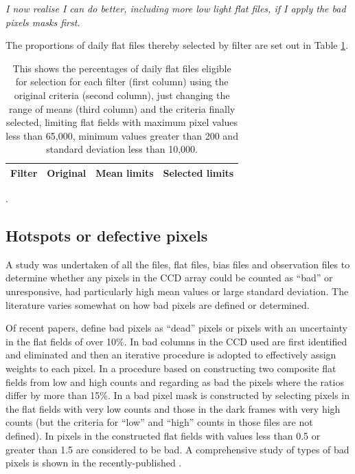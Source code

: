 \textit{I now realise I can do better, including more low light flat files, if
I apply the bad pixels masks first.}

The proportions of daily flat files thereby selected by filter are set out in
Table \ref{table:selectedflats}.

\begin{table}[!htbp]
\begin{center}
\begin{tabular}{lrrr} \hline
Filter & Original & Mean limits & Selected limits\\\hline

\hline
\end{tabular}
\end{center}
\caption{This shows the percentages of daily flat files eligible for selection
for each filter (first column) using the original criteria (second column),
just changing the range of means (third column) and the criteria finally
selected, limiting flat fields with maximum pixel values less than 65,000,
minimum values greater than 200 and standard deviation less than 10,000.}.
\protect\label{table:selectedflats}
\end{table}
\clearpage

\subsection{Hotspots or defective pixels}
\protect\label{section:hotspots}

A study was undertaken of all the files, flat files, bias files and observation
files to determine whether any pixels in the CCD array could be counted as
``bad'' or unresponsive, had particularly high mean values or large standard
deviation. The literature varies somewhat on how bad pixels are defined or
determined.

Of recent papers, \citet{allers20} define bad pixels as ``dead'' pixels or pixels
with an uncertainty in the flat fields of over 10\%. In \citet{piskunov20} bad
columns in the CCD used are first identified and eliminated and then an
iterative procedure is adopted to effectively assign weights to each pixel. In
\citet{bongiovanni19} a procedure based on constructing two composite flat
fields from low and high counts and regarding as bad the pixels where the ratios
differ by more than 15\%. In \citet{belli18} a bad pixel mask is constructed by
selecting pixels in the flat fields with very low counts and those in the dark
frames with very high counts (but the criteria for ``low'' and ``high'' counts
in those files are not defined). In \citet{briesemeister18} pixels in the
constructed flat fields with values less than 0.5 or greater than 1.5 are
considered to be bad. A comprehensive study of types of bad pixels is shown in
the recently-published \citet{maslennikova20}.

